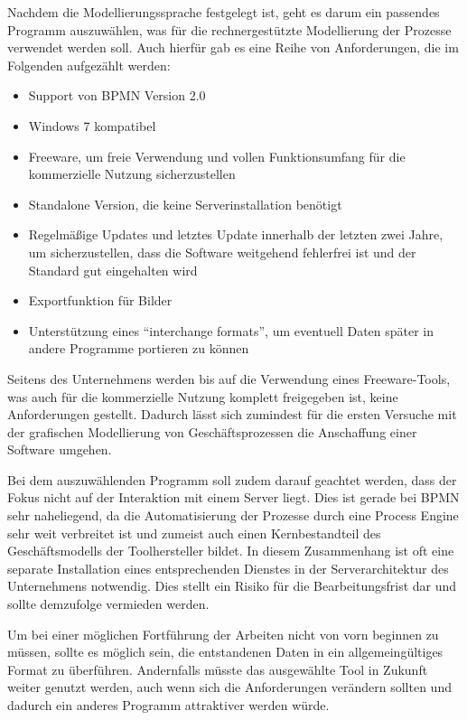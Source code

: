 \documentclass[a4paper,12pt]{report}
\begin{document}
Nachdem die Modellierungssprache festgelegt ist, geht es darum ein passendes Programm auszuwählen, was für die rechnergestützte Modellierung der Prozesse verwendet werden soll. Auch hierfür gab es eine Reihe von Anforderungen, die im Folgenden aufgezählt werden:
\begin{itemize}
\item Support von BPMN Version 2.0
\item Windows 7 kompatibel
\item Freeware, um freie Verwendung und vollen Funktionsumfang für die kommerzielle Nutzung sicherzustellen
\item Standalone Version, die keine Serverinstallation benötigt
\item Regelmäßige Updates und letztes Update innerhalb der letzten zwei Jahre, um sicherzustellen, dass die Software weitgehend fehlerfrei ist und der Standard gut eingehalten wird
\item Exportfunktion für Bilder
\item Unterstützung eines "`interchange formats"', um eventuell Daten später in andere Programme portieren zu können
\end{itemize}
Seitens des Unternehmens werden bis auf die Verwendung eines Freeware-Tools, was auch für die kommerzielle Nutzung komplett freigegeben ist, keine Anforderungen gestellt. Dadurch lässt sich zumindest für die ersten Versuche mit der grafischen Modellierung von Geschäftsprozessen die Anschaffung einer Software umgehen.

Bei dem auszuwählenden Programm soll zudem darauf geachtet werden, dass der Fokus nicht auf der Interaktion mit einem Server liegt. Dies ist gerade bei BPMN sehr naheliegend, da die Automatisierung der Prozesse durch eine Process Engine sehr weit verbreitet ist und zumeist auch einen Kernbestandteil des Geschäftsmodells der Toolhersteller bildet. In diesem Zusammenhang ist oft eine separate Installation eines entsprechenden Dienstes in der Serverarchitektur des Unternehmens notwendig. Dies stellt ein Risiko für die Bearbeitungsfrist dar und sollte demzufolge vermieden werden.

Um bei einer möglichen Fortführung der Arbeiten nicht von vorn beginnen zu müssen, sollte es möglich sein, die entstandenen Daten in ein allgemeingültiges Format zu überführen. Andernfalls müsste das ausgewählte Tool in Zukunft weiter genutzt werden, auch wenn sich die Anforderungen verändern sollten und dadurch ein anderes Programm attraktiver werden würde.
\end{document}
